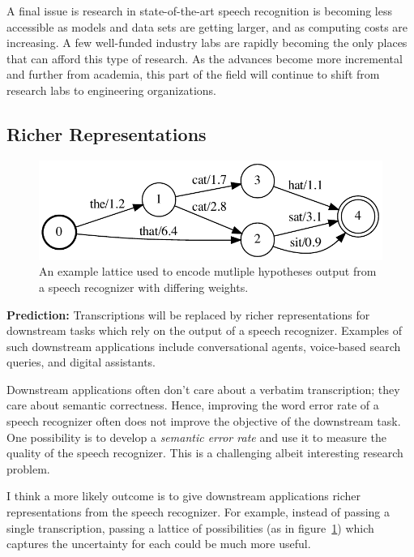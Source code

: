 A final issue is research in state-of-the-art speech recognition is becoming
less accessible as models and data sets are getting larger, and as computing
costs are increasing. A few well-funded industry labs are rapidly becoming the
only places that can afford this type of research. As the advances become more
incremental and further from academia, this part of the field will continue to
shift from research labs to engineering organizations.

\subsection{Richer Representations}

\begin{figure}
\centering
\includegraphics[width=\linewidth]{figures/lattice}
\caption{An example lattice used to encode mutliple hypotheses output from a
    speech recognizer with differing weights.}
\label{fig:lattice}
\end{figure}

{\bf Prediction:} Transcriptions will be replaced by richer representations for
downstream tasks which rely on the output of a speech recognizer. Examples of
such downstream applications include conversational agents, voice-based search
queries, and digital assistants.

Downstream applications often don't care about a verbatim transcription; they
care about semantic correctness. Hence, improving the word error rate of a
speech recognizer often does not improve the objective of the downstream task.
One possibility is to develop a \emph{semantic error rate} and use
it to measure the quality of the speech recognizer. This is a challenging
albeit interesting research problem.

I think a more likely outcome is to give downstream applications richer
representations from the speech recognizer. For example, instead of passing a
single transcription, passing a lattice of possibilities (as in
figure~\ref{fig:lattice}) which captures the uncertainty for each could be much
more useful.

